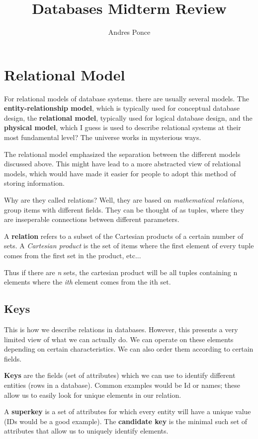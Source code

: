 \documentclass{article}
\author{Andres Ponce}
\title{Databases Midterm Review}
\begin{document}
\maketitle
\section{Relational Model}
For relational models of database systems. there are usually several models.
The \textbf{entity-relationship model}, which is typically used for conceptual database design,
the \textbf{relational model}, typically used for logical database design, and the \textbf{physical model},
which I guess is used to describe relational systems at their most fundamental level? The universe works in 
mysterious ways.

The relational model emphasized the separation between the different models discussed above. This might have lead
to a more abstracted view of relational models, which would have made it easier for people to adopt this method
of storing information.

Why are they called relations? Well, they are based on \textit{mathematical relations}, group items with different
fields. They can be thought of as tuples, where they are inseperable connections between different parameters.

A \textbf{relation} refers to a subset of the Cartesian products of a certain number of sets. A \textit{Cartesian product}
is the set of items where the first element of every tuple comes from the first set in the product, etc...

Thus if there are \textit{n} sets, the cartesian product will be all tuples containing n elements where the \textit{ith} element
comes from the ith set.

\subsection{Keys}
This is how we describe relations in databases. However, this presents a very limited view of what we can actually do. We can
operate on these elements depending on certain characteristics. We can also order them according to certain fields.

\textbf{Keys} are the fields (set of attributes) which we can use to identify different entities (rows in a database). Common 
examples would be Id or names; these allow us to easily look for unique elements in our relation.

A \textbf{superkey} is a set of attributes for which every entity will have a unique value (IDs would be a good example). The
\textbf{candidate key} is the minimal such set of attributes that allow us to uniquely identify elements.
\end{document}
